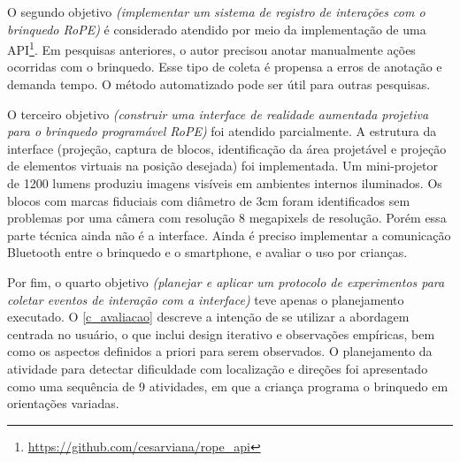 O segundo objetivo \textit{(implementar um sistema de registro de interações com o brinquedo RoPE)} é considerado atendido por meio da implementação de uma \ac{API}\footnote{\url{https://github.com/cesarviana/rope_api}}. Em pesquisas anteriores, o autor precisou anotar manualmente ações ocorridas com o brinquedo. Esse tipo de coleta é propensa a erros de anotação e demanda tempo. O método automatizado pode ser útil para outras pesquisas. 

O terceiro objetivo \textit{(construir uma interface de realidade aumentada projetiva para o brinquedo programável RoPE)} foi atendido parcialmente. A estrutura da interface (projeção, captura de blocos, identificação da área projetável e projeção de elementos virtuais na posição desejada) foi implementada. Um mini-projetor de 1200 lumens produziu imagens visíveis em ambientes internos iluminados. Os blocos com marcas fiduciais com diâmetro de 3cm foram identificados sem problemas por uma câmera com resolução 8 megapixels de resolução. Porém essa parte técnica ainda não é a interface. Ainda é preciso implementar a comunicação Bluetooth entre o brinquedo e o smartphone, e avaliar o uso por crianças.

Por fim, o quarto objetivo \textit{(planejar e aplicar um protocolo de experimentos para coletar eventos de interação com a interface)} teve apenas o planejamento executado. O \autoref{c_avaliacao} descreve a intenção de se utilizar a abordagem centrada no usuário, o que inclui design iterativo e observações empíricas, bem como os aspectos definidos a priori para serem observados. O planejamento da atividade para detectar dificuldade com localização e direções foi apresentado como uma sequência de 9 atividades, em que a criança programa o brinquedo em orientações variadas. 







